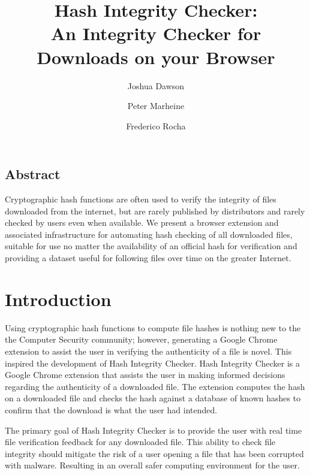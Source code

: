 \documentclass[letterpaper,twocolumn,10pt]{article}
\begin{document}
\date{}

\title{\Large \bf Hash Integrity Checker:\protect\\An Integrity Checker for Downloads on your Browser}

\author{
{\rm Joshua Dawson}
\and
{\rm Peter Marheine}
\and
{\rm Frederico Rocha}
}

\maketitle


\subsection*{Abstract}

Cryptographic hash functions are often used to verify the integrity of files downloaded from the internet, but are rarely published by distributors and rarely checked by users even when available. We present a browser extension and associated infrastructure for automating hash checking of all downloaded files, suitable for use no matter the availability of an official hash for verification and providing a dataset useful for following files over time on the greater Internet.

\section{Introduction}

Using cryptographic hash functions to compute file hashes is nothing new to the the Computer Security community; however, generating a Google Chrome extension to assist the user in verifying the authenticity of a file is novel. This inspired the development of Hash Integrity Checker. Hash Integrity Checker is a Google Chrome extension that assists the user in making informed decisions regarding the authenticity of a downloaded file. The extension computes the hash on a downloaded file and checks the hash against a database of known hashes to confirm that the download is what the user had intended.

The primary goal of Hash Integrity Checker is to provide the user with real time file verification feedback for any downloaded file. This ability to check file integrity should mitigate the risk of a user opening a file that has been corrupted with malware. Resulting in an overall safer computing environment for the user.
\end{document}
